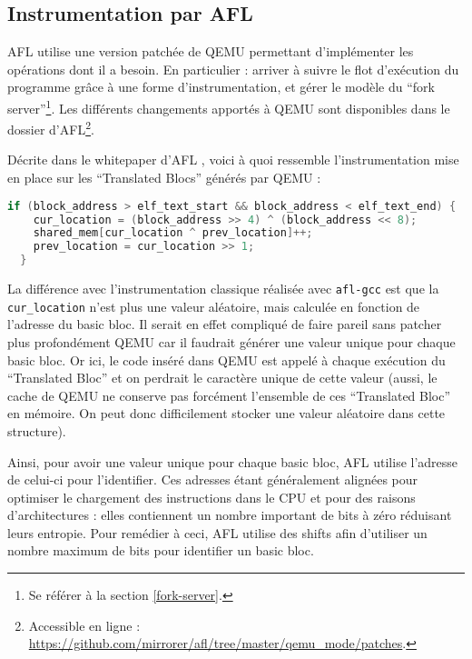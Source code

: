 \subsection{Instrumentation par AFL}

AFL utilise une version patchée de QEMU permettant d'implémenter les opérations dont il a besoin.
En particulier : arriver à suivre le flot d'exécution du programme grâce à une forme d'instrumentation, et gérer le modèle du ``fork server''\footnote{Se référer à la section \ref{fork-server}.}.
Les différents changements apportés à QEMU sont disponibles dans le dossier  d'AFL\footnote{Accessible en ligne : \url{https://github.com/mirrorer/afl/tree/master/qemu_mode/patches}.}.

Décrite dans le whitepaper d'AFL \cite[section 12 : Binary-only instrumentation]{technical-details}, voici à quoi ressemble l'instrumentation mise en place sur les ``Translated Blocs'' générés par QEMU :
\begin{lstlisting}[language=C]
  if (block_address > elf_text_start && block_address < elf_text_end) {
    cur_location = (block_address >> 4) ^ (block_address << 8);
    shared_mem[cur_location ^ prev_location]++;
    prev_location = cur_location >> 1;
  }
\end{lstlisting}

La différence avec l'instrumentation classique réalisée avec \lstinline{afl-gcc} est que la \lstinline{cur_location} n'est plus une valeur aléatoire, mais calculée en fonction de l'adresse du basic bloc.
Il serait en effet compliqué de faire pareil sans patcher plus profondément QEMU car il faudrait générer une valeur unique pour chaque basic bloc.
Or ici, le code inséré dans QEMU est appelé à chaque exécution du ``Translated Bloc'' et on perdrait le caractère unique de cette valeur (aussi, le cache de QEMU ne conserve pas forcément l'ensemble de ces ``Translated Bloc'' en mémoire. On peut donc difficilement stocker une valeur aléatoire dans cette structure).

Ainsi, pour avoir une valeur unique pour chaque basic bloc, AFL utilise l'adresse de celui-ci pour l'identifier.
Ces adresses étant généralement alignées pour optimiser le chargement des instructions dans le CPU et pour des raisons d'architectures : elles contiennent un nombre important de bits à zéro réduisant leurs entropie.
Pour remédier à ceci, AFL utilise des shifts afin d'utiliser un nombre maximum de bits pour identifier un basic bloc.


